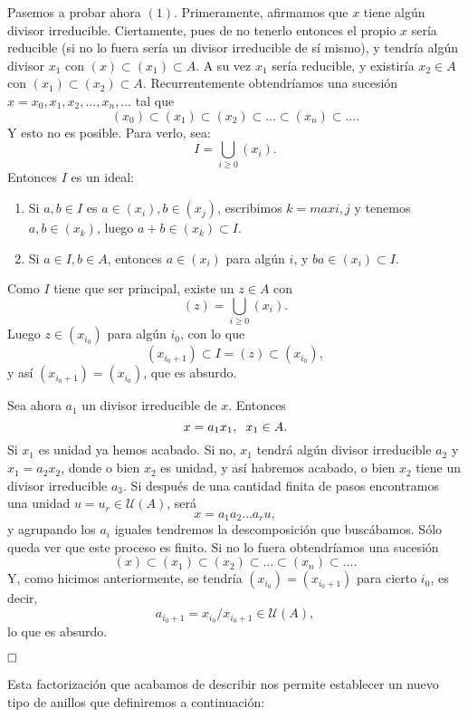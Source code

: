 \documentclass[12pt]{article}
\begin{document}
Pasemos a probar ahora $(1)$. Primeramente, afirmamos que $x$ tiene algún divisor irreducible. Ciertamente, pues de no tenerlo entonces el propio $x$ sería reducible (si no lo fuera sería un divisor irreducible de sí mismo), y tendría algún divisor $x_{1}$ con $(x) \subset (x_{1}) \subset A.$ A su vez $x_{1}$ sería reducible, y existiría $x_{2} \in A$ con $(x_{1}) \subset (x_{2}) \subset A$. Recurrentemente obtendríamos una sucesión $x = x_{0}, x_{1}, x_{2}, \ldots , x_{n}, \ldots$ tal que $$(x_{0}) \subset (x_{1}) \subset (x_{2}) \subset \ldots \subset (x_{n}) \subset \ldots .$$ Y esto no es posible. Para verlo, sea: $$ I = \bigcup_{i \geq 0} (x_{i}).$$ Entonces $I$ es un ideal: \begin{enumerate}
\item Si $a,b \in I$ es $a \in (x_{i}), b \in (x_{j})$, escribimos $k = max {i,j}$ y tenemos $a,b \in (x_{k})$, luego $a + b \in (x_{k}) \subset I$.
\item  Si $a \in I, b \in A$, entonces $a \in (x_{i})$ para algún $i$, y $ba \in (x_{i}) \subset I$. 
\end{enumerate}
Como $I$ tiene que ser principal, existe un $z \in A$ con $$(z) = \bigcup_{i \geq 0} (x_{i}).$$ Luego $z \in (x_{i_{0}})$ para algún $i_{0}$, con lo que $$(x_{i_{0}+1}) \subset I = (z) \subset (x_{i_{0}}),$$ y así $(x_{i_{0}+1}) = (x_{i_{0}})$, que es absurdo.

Sea ahora $a_{1}$ un divisor irreducible de $x$. Entonces $$x = a_{1}x_{1}, \hspace{0.2cm} x_{1} \in A.$$ Si $x_{1}$ es unidad ya hemos acabado. Si no, $x_{1}$ tendrá algún divisor irreducible $a_{2}$ y $x_{1} = a_{2}x_{2}$, donde o bien $x_{2}$ es unidad, y así habremos acabado, o bien $x_{2}$ tiene un divisor irreducible $a_{3}$. Si después de una cantidad finita de pasos encontramos una unidad $u = u_{r} \in \mathcal{U}(A)$, será $$x = a_{1}a_{2} \ldots a_{r}u,$$ y agrupando los $a_{i}$ iguales tendremos la descomposición que buscábamos. Sólo queda ver que este proceso es finito. Si no lo fuera obtendríamos una sucesión $$(x) \subset (x_{1}) \subset (x_{2}) \subset \ldots \subset (x_{n}) \subset \ldots .$$ Y, como hicimos anteriormente, se tendría $(x_{i_{0}}) = (x_{i_{0}+1})$ para cierto $i_{0}$, es decir, $$a_{i_{0}+1} = x_{i_{0}}/ x_{i_{0}+1} \in \mathcal{U}(A),$$ lo que es absurdo.

$\hfill \square$

Esta factorización que acabamos de describir nos permite establecer un nuevo tipo de anillos que definiremos a continuación:
\end{document}
